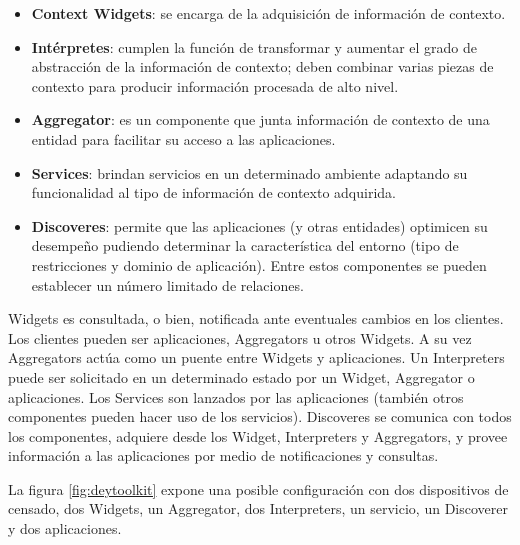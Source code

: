\begin{itemize}

\item 
\textbf{Context Widgets}: se encarga de la adquisición de información de
contexto.

\item
\textbf{Intérpretes}: cumplen la función de transformar y aumentar el grado de
abstracción de la información de contexto; deben combinar varias piezas de
contexto para producir información procesada de alto nivel.

\item
\textbf{Aggregator}: es un componente que junta información de contexto de una
entidad para facilitar su acceso a las aplicaciones.

\item
\textbf{Services}: brindan servicios en un determinado ambiente adaptando su
funcionalidad al tipo de información de contexto adquirida.

\item
\textbf{Discoveres}: permite que las aplicaciones (y otras entidades) optimicen
su desempeño pudiendo determinar la característica del entorno (tipo de
restricciones y dominio de aplicación). Entre estos componentes se pueden
establecer un número limitado de relaciones.

\end{itemize} 

Widgets es consultada, o bien, notificada ante eventuales cambios en los clientes. Los
clientes pueden ser aplicaciones, Aggregators u otros Widgets. A su vez Aggregators actúa como un puente entre Widgets y aplicaciones. Un Interpreters puede ser solicitado en un determinado estado por un Widget, Aggregator o aplicaciones. Los Services son lanzados por las aplicaciones (también otros componentes pueden hacer uso de los servicios). Discoveres se comunica con todos los componentes, adquiere desde los Widget, Interpreters y Aggregators, y provee información a las aplicaciones por medio de notificaciones y consultas.

La figura \ref{fig:deytoolkit} expone una posible configuración con dos dispositivos de censado, dos Widgets, un Aggregator, dos Interpreters, un servicio, un Discoverer y dos aplicaciones.


